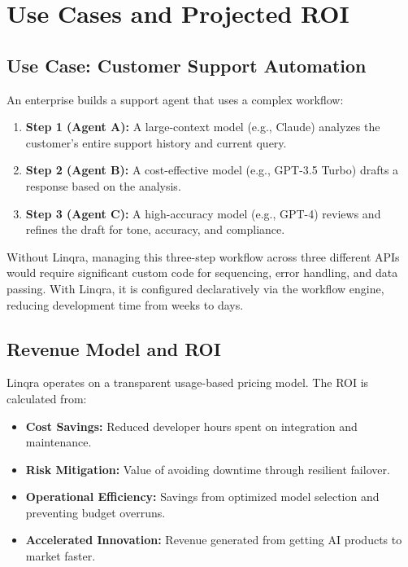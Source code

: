 \documentclass[11pt,a4paper]{article}
\begin{document}
\newpage
\section{Use Cases and Projected ROI}
\subsection{Use Case: Customer Support Automation}
An enterprise builds a support agent that uses a complex workflow:

\begin{enumerate}[leftmargin=*]
  \item \textbf{Step 1 (Agent A):} A large-context model (e.g., Claude) analyzes the customer's entire support history and current query.
  \item \textbf{Step 2 (Agent B):} A cost-effective model (e.g., GPT-3.5 Turbo) drafts a response based on the analysis.
  \item \textbf{Step 3 (Agent C):} A high-accuracy model (e.g., GPT-4) reviews and refines the draft for tone, accuracy, and compliance.
\end{enumerate}

Without Linqra, managing this three-step workflow across three different APIs would require significant custom code for sequencing, error handling, and data passing. With Linqra, it is configured declaratively via the workflow engine, reducing development time from weeks to days.

\subsection{Revenue Model and ROI}
Linqra operates on a transparent usage-based pricing model. The ROI is calculated from:

\begin{itemize}[leftmargin=1.8em]
  \item[\textcolor{linqraprimary}{\faCoins}] \textbf{Cost Savings:} Reduced developer hours spent on integration and maintenance.
  \item[\textcolor{linqraprimary}{\faIcon{shield-alt}}] \textbf{Risk Mitigation:} Value of avoiding downtime through resilient failover.
  \item[\textcolor{linqraprimary}{\faCogs}] \textbf{Operational Efficiency:} Savings from optimized model selection and preventing budget overruns.
  \item[\textcolor{linqraprimary}{\faRocket}] \textbf{Accelerated Innovation:} Revenue generated from getting AI products to market faster.
\end{itemize}
\end{document}
